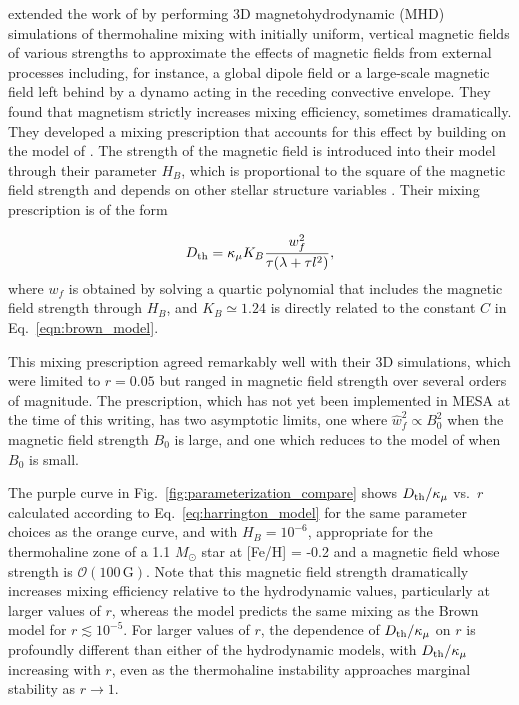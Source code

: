 \citet{harrington} extended the work of \citet{brown_etal_2013} by performing 3D magnetohydrodynamic (MHD) simulations of thermohaline mixing with initially uniform, vertical magnetic fields of various strengths to approximate the effects of magnetic fields from external processes including, for instance, a global dipole field or a large-scale magnetic field left behind by a dynamo acting in the receding convective envelope. 
They found that magnetism strictly increases mixing efficiency, sometimes dramatically.
They developed a mixing prescription that accounts for this effect by building on the model of \citet{brown_etal_2013}.
The strength of the magnetic field is introduced into their model through their parameter $H_B$, which is proportional to the square of the magnetic field strength and depends on other stellar structure variables \citep[see Eq.~19 of][]{harrington}.
Their mixing prescription is of the form

\begin{equation} \label{eq:harrington_model}
    \Dth = \kappa_{\mu}K_B\frac{w_f^2}{\tau (\lambda + \tau l^2)},
\end{equation}
where $w_f$ is obtained by solving a quartic polynomial that includes the magnetic field strength through $H_B$, and $K_B \simeq 1.24$ is directly related to the constant $C$ in Eq.~\eqref{eqn:brown_model}.

This mixing prescription agreed remarkably well with their 3D simulations, which were limited to $r = 0.05$ but ranged in magnetic field strength over several orders of magnitude.
The prescription, which has not yet been implemented in MESA at the time of this writing, has two asymptotic limits, one where $\hat{w}_f^2 \propto B_0^2$ when the magnetic field strength $B_0$ is large, and one which reduces to the model of \citet{brown_etal_2013} when $B_0$ is small.

The purple curve in Fig.~\ref{fig:parameterization_compare} shows $D_\mathrm{th}/\kappa_\mu$ vs.~$r$ calculated according to Eq.~\eqref{eq:harrington_model} for the same parameter choices as the orange curve, and with $H_B = 10^{-6}$, appropriate for the thermohaline zone of a 1.1 $M_\odot$ star at [Fe/H] = -0.2 and a magnetic field whose strength is $\mathcal{O}(100 \,\mathrm{G})$. 
Note that this magnetic field strength dramatically increases mixing efficiency relative to the hydrodynamic values, particularly at larger values of $r$, whereas the model predicts the same mixing as the Brown model for $r \lesssim 10^{-5}$. 
For larger values of $r$, the dependence of $D_\mathrm{th}/\kappa_\mu$ on $r$ is profoundly different than either of the hydrodynamic models, with $D_\mathrm{th}/\kappa_\mu$ increasing with $r$, even as the thermohaline instability approaches marginal stability as $r \to 1$.

